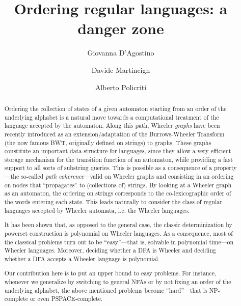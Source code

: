 \documentclass[runningheads]{llncs}
\begin{document}
%
\title{Ordering regular languages: a danger zone}%
%
%
\author{Giovanna D'Agostino \and
Davide Martincigh \and
Alberto Policriti}
%
%
%
\maketitle              %
%
\begin{abstract}
Ordering the collection of states of a given automaton starting from an order of the underlying alphabet is a natural move towards a computational treatment of the  language accepted by the automaton. Along this path, 
Wheeler \emph{graphs} have been recently introduced as an extension/adaptation of the Burrows-Wheeler Transform (the now famous BWT, originally defined on strings) to graphs. These graphs constitute an important data-structure for languages, since they allow a very efficient storage mechanism for the transition function of an automaton, while providing a fast support to  all sorts of  substring queries. This is possible as a consequence of a property---the so-called \emph{path coherence}---valid on Wheeler graphs and consisting in an ordering on nodes that ``propagates'' to (collections of) strings. By looking at a Wheeler graph as an automaton, the ordering on strings corresponds to the co-lexicographic order of the words entering each state. This leads naturally to consider the class of regular languages accepted by Wheeler automata, i.e. the Wheeler languages.

It has been shown that, as opposed to the general case, the classic determinization by powerset construction is polynomial on Wheeler languages. As a consequence, most of the classical problems  turn out to be ``easy''---that is, solvable in polynomial time---on Wheeler languages. Moreover,  deciding whether a DFA is Wheeler and deciding whether a DFA accepts a Wheeler language is polynomial. 

Our contribution here is to put an upper bound to easy problems. For instance, whenever we generalize by switching to general NFAs or by not fixing an order of the underlying alphabet, the above mentioned problems become ``hard''---that is NP-complete or even PSPACE-complete.

\end{abstract}
%
%
%
\end{document}
